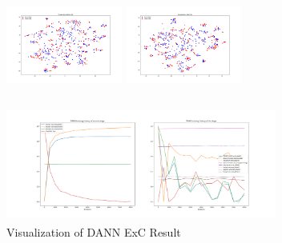 \documentclass[conference]{IEEEtran}
\begin{document}
\begin{figure}[htb]
\centering
\begin{minipage}[t]{0.2\textwidth}
\includegraphics[width=1.5in, height=1.5in]{Ldann/std_C2R/before.png}
\end{minipage}%
\begin{minipage}[t]{0.2\textwidth}
\includegraphics[width=1.5in, height=1.5in]{Ldann/std_C2R/after.png}
\end{minipage}%
\begin{minipage}[t]{0.45\textwidth}
\includegraphics[width=3.5in, height=1.5in]{Ldann/std_C2R/dann.png}
\end{minipage}%
\caption{Visualization of DANN ExC Result}\label{fig:ExC2}
\end{figure}
\end{document}
